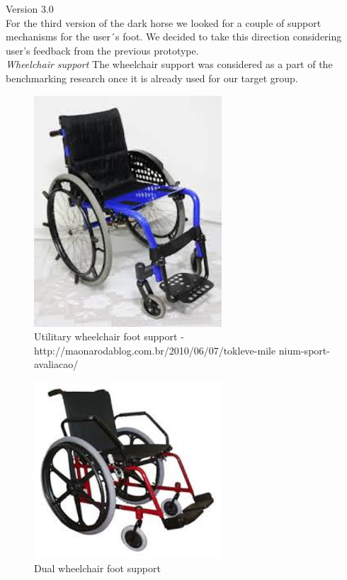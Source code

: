 Version 3.0 \\

For the third version of the dark horse we looked for a couple of support mechanisms for the user´s foot. We decided to take this direction considering user’s feedback from the previous prototype. \\

\emph{Wheelchair support} The wheelchair support was considered as a part of the benchmarking research once it is already used for our target group. 

\begin{figure}[h]
\centering
\includegraphics[width=7cm]{brazil_images/image022.jpg}
\caption{Utilitary wheelchair foot support - http://maonarodablog.com.br/2010/06/07/tokleve-mile
nium-sport-avaliacao/}
\label{fig:utilitary_wheelchair}
\end{figure}


\begin{figure}[h]
\centering
\includegraphics[width=7cm]{brazil_images/image023.jpg}
\caption{Dual wheelchair foot support} %
\label{fig:dual_wheelchair}
\end{figure}

